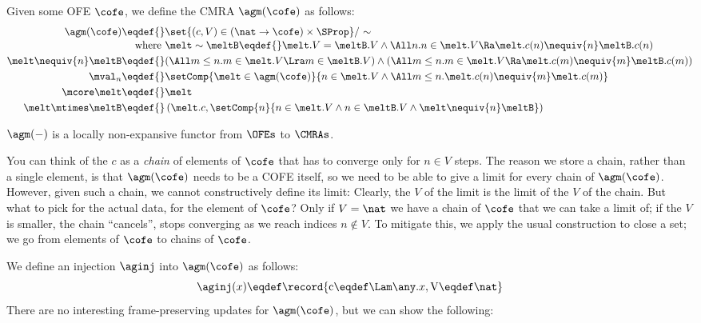 Given some OFE $\cofe$, we define the CMRA $\agm(\cofe)$ as follows:
\begin{align*}
  \agm(\cofe) \eqdef{}& \set{(c, V) \in (\nat \to \cofe) \times \SProp}/\ {\sim} \\[-0.2em]
  \textnormal{where }& \melt \sim \meltB \eqdef{} \melt.V = \meltB.V \land 
    \All n. n \in \melt.V \Ra \melt.c(n) \nequiv{n} \meltB.c(n)  \\
  \melt \nequiv{n} \meltB \eqdef{}& (\All m \leq n. m \in \melt.V \Lra m \in \meltB.V) \land (\All m \leq n. m \in \melt.V \Ra \melt.c(m) \nequiv{m} \meltB.c(m)) \\
  \mval_n \eqdef{}& \setComp{\melt \in \agm(\cofe)}{ n \in \melt.V \land \All m \leq n. \melt.c(n) \nequiv{m} \melt.c(m) } \\
  \mcore\melt \eqdef{}& \melt \\
  \melt \mtimes \meltB \eqdef{}& \left(\melt.c, \setComp{n}{n \in \melt.V \land n \in \meltB.V \land \melt \nequiv{n} \meltB }\right)
\end{align*}

$\agm(-)$ is a locally non-expansive functor from $\OFEs$ to $\CMRAs$.

You can think of the $c$ as a \emph{chain} of elements of $\cofe$ that has to converge only for $n \in V$ steps.
The reason we store a chain, rather than a single element, is that $\agm(\cofe)$ needs to be a COFE itself, so we need to be able to give a limit for every chain of $\agm(\cofe)$.
However, given such a chain, we cannot constructively define its limit: Clearly, the $V$ of the limit is the limit of the $V$ of the chain.
But what to pick for the actual data, for the element of $\cofe$?
Only if $V = \nat$ we have a chain of $\cofe$ that we can take a limit of; if the $V$ is smaller, the chain ``cancels'', \ie stops converging as we reach indices $n \notin V$.
To mitigate this, we apply the usual construction to close a set; we go from elements of $\cofe$ to chains of $\cofe$.

We define an injection $\aginj$ into $\agm(\cofe)$ as follows:
\[ \aginj(x) \eqdef \record{\mathrm c \eqdef \Lam \any. x, \mathrm V \eqdef \nat} \]
There are no interesting frame-preserving updates for $\agm(\cofe)$, but we can show the following:
\begin{mathpar}

  
\end{mathpar}


